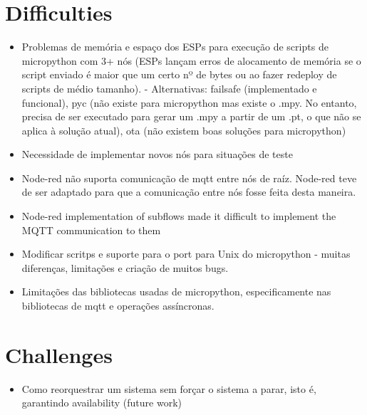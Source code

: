 \section{Difficulties}
\begin{itemize}
    \item Problemas de memória e espaço dos ESPs para execução de scripts de micropython com 3+ nós (ESPs lançam erros de alocamento de memória se o script enviado é maior que um certo nº de bytes ou ao fazer redeploy de scripts de médio tamanho). - Alternativas: failsafe (implementado e funcional), pyc (não existe para micropython mas existe o .mpy. No entanto, precisa de ser executado para gerar um .mpy a partir de um .pt, o que não se aplica à solução atual), ota (não existem boas soluções para micropython)
    \item Necessidade de implementar novos nós para situações de teste
    \item Node-red não suporta comunicação de mqtt entre nós de raíz. Node-red teve de ser adaptado para que a comunicação entre nós fosse feita desta maneira.
    \item Node-red implementation of subflows made it difficult to implement the MQTT communication to them
    \item Modificar scritps e suporte para o port para Unix do micropython - muitas diferenças, limitações e criação de muitos bugs.
    \item Limitações das bibliotecas usadas de micropython, especificamente nas bibliotecas de mqtt e operações assíncronas.
\end{itemize}{}

\section{Challenges}
\begin{itemize}
    \item Como reorquestrar um sistema sem forçar o sistema a parar, isto é, garantindo availability (future work)
\end{itemize}



